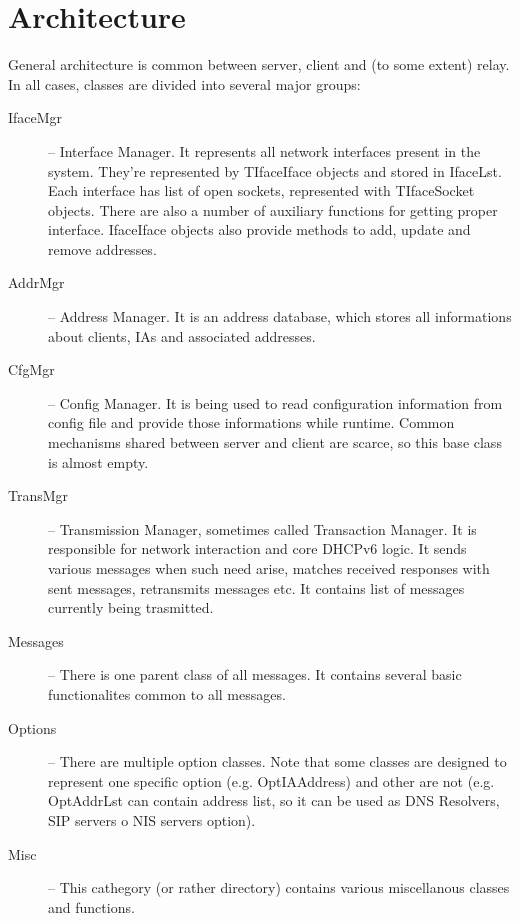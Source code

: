 
\section{Architecture}

General architecture is common between server, client and (to some extent)
relay. In all cases, classes are divided into several major groups:
\begin{description}
\item[IfaceMgr] -- Interface Manager. It represents all network interfaces present in the
  system. They're represented by TIfaceIface objects and stored in
  IfaceLst. Each interface has list of open sockets, represented with
  TIfaceSocket objects. There are also a number of auxiliary functions
  for getting proper interface. IfaceIface objects  also provide
  methods to add, update and remove addresses.
\item[AddrMgr] -- Address Manager. It is an address database, which
  stores all informations about clients, IAs and associated addresses.
\item[CfgMgr] -- Config Manager. It is being used to read
  configuration information from config file and provide those
  informations while runtime. Common mechanisms shared between server
  and client are scarce, so this base class is almost empty.
\item[TransMgr] -- Transmission Manager, sometimes called Transaction
  Manager. It is responsible for network interaction and core DHCPv6
  logic. It sends various messages when such need arise, matches received
  responses with sent messages, retransmits messages etc. It contains
  list of messages currently being trasmitted. 
\item[Messages] -- There is one parent class of all messages. It
  contains several basic functionalites common to all messages.
\item[Options] -- There are multiple option classes. Note that some
  classes are designed to represent one specific option
  (e.g. OptIAAddress) and other are not (e.g. OptAddrLst can contain
  address list, so it can be used as DNS Resolvers, SIP servers o NIS
  servers option). 
\item[Misc] -- This cathegory (or rather directory) contains various
  miscellanous classes and functions.
\end{description}

